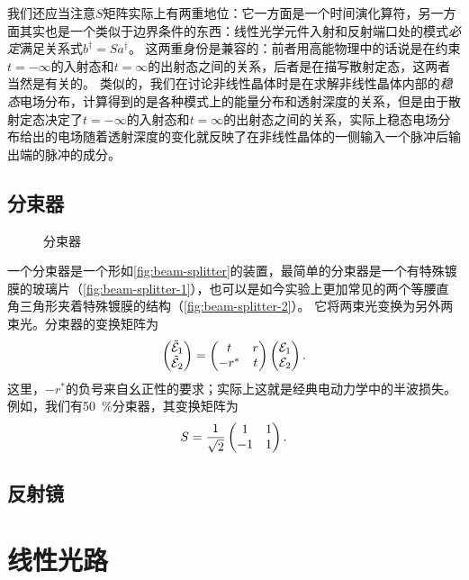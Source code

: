 我们还应当注意$S$矩阵实际上有两重地位：它一方面是一个时间演化算符，另一方面其实也是一个类似于边界条件的东西：线性光学元件入射和反射端口处的模式\emph{必定}满足关系式$b^\dagger = S a^\dagger$。
这两重身份是兼容的：前者用高能物理中的话说是在约束$t = -\infty$的入射态和$t = \infty$的出射态之间的关系，后者是在描写散射定态，这两者当然是有关的。
类似的，我们在讨论非线性晶体时是在求解非线性晶体内部的\emph{稳态}电场分布，计算得到的是各种模式上的能量分布和透射深度的关系，但是由于散射定态决定了$t = -\infty$的入射态和$t = \infty$的出射态之间的关系，实际上稳态电场分布给出的电场随着透射深度的变化就反映了在非线性晶体的一侧输入一个脉冲后输出端的脉冲的成分。

\subsection{分束器}

\begin{figure}
    \centering
    \subfigure[]{
        
        \label{fig:beam-splitter-1}
    }
    \subfigure[]{
        
        \label{fig:beam-splitter-2}
    }
    \caption{分束器}
    \label{fig:beam-splitter}
\end{figure}

一个分束器是一个形如\autoref{fig:beam-splitter}的装置，最简单的分束器是一个有特殊镀膜的玻璃片（\autoref{fig:beam-splitter-1}），也可以是如今实验上更加常见的两个等腰直角三角形夹着特殊镀膜的结构（\autoref{fig:beam-splitter-2}）。
它将两束光变换为另外两束光。分束器的变换矩阵为
\begin{equation}
    \pmqty{\tilde{\mathcal{E}}_1 \\ \tilde{\mathcal{E}}_2} = \pmqty{t & r \\ - r^* & t} \pmqty{\mathcal{E}_1 \\ \mathcal{E}_2}.
\end{equation}
这里，$-r^*$的负号来自幺正性的要求；实际上这就是经典电动力学中的半波损失。
例如，我们有\SI{50}{\percent}分束器，其变换矩阵为
\begin{equation}
    S = \frac{1}{\sqrt{2}} \pmqty{1 & 1 \\ -1 & 1}.
\end{equation}

\subsection{反射镜}

\section{线性光路}

